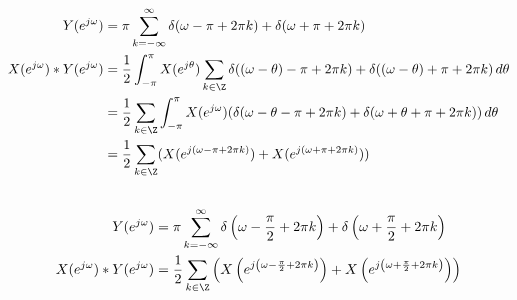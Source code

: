 \documentclass{article}
\begin{document}
\begin{align}
    Y(e^{j \omega}) &= \pi \sum_{k = -\infty}^\infty \delta(\omega - \pi + 2\pi k) + \delta(\omega + \pi + 2\pi k) \\
    X(e^{j \omega}) \ast Y(e^{j \omega}) &= \frac{1}{2} \int_{-\pi}^\pi X(e^{j \theta}) \sum_{k \in \Z} \delta((\omega - \theta) - \pi + 2\pi k) + \delta((\omega - \theta) + \pi + 2\pi k) \, d\theta \\
    &= \frac{1}{2} \sum_{k \in \Z} \int_{-\pi}^\pi X(e^{j \omega}) (\delta(\omega - \theta - \pi + 2\pi k) + \delta(\omega + \theta + \pi + 2\pi k)) \, d\theta \\
    &= \frac{1}{2} \sum_{k \in \Z} (X(e^{j (\omega - \pi + 2\pi k)}) + X(e^{j (\omega + \pi + 2\pi k)}))
\end{align}
\begin{center}
\end{center}

\subsection{}

\begin{align}
    Y(e^{j \omega}) &= \pi \sum_{k = -\infty}^\infty \delta\left(\omega - \frac{\pi}{2} + 2\pi k\right) + \delta\left(\omega + \frac{\pi}{2} + 2\pi k\right) \\
    X(e^{j \omega}) \ast Y(e^{j \omega}) &= \frac{1}{2} \sum_{k \in \Z} \left(X\left(e^{j \left(\omega - \frac{\pi}{2} + 2\pi k\right)}\right) + X\left(e^{j \left(\omega + \frac{\pi}{2} + 2\pi k\right)}\right)\right)
\end{align}
\begin{center}
\end{center}
\end{document}
